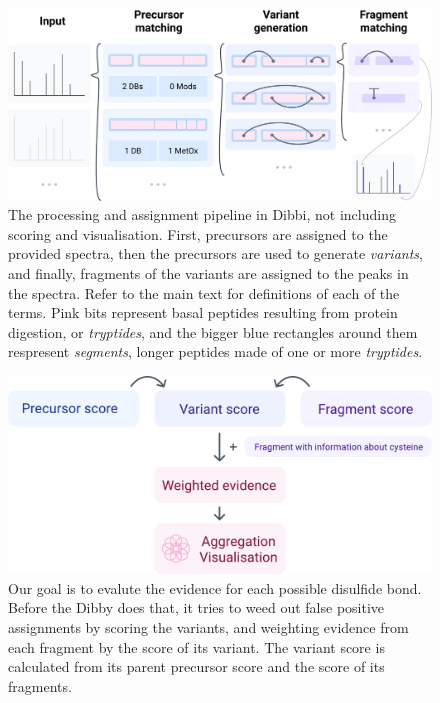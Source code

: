 \begin{figure}
	\centering
	\includegraphics[width=\linewidth]{img/pipeline.pdf}
	\caption{The processing and assignment pipeline in Dibbi, not including scoring and visualisation. First, precursors are assigned to the provided spectra, then the precursors are used to generate \emph{variants}, and finally, fragments of the variants are assigned to the peaks in the spectra. Refer to the main text for definitions of each of the terms. Pink bits represent basal peptides resulting from protein digestion, or \emph{tryptides}, and the bigger blue rectangles around them respresent \emph{segments}, longer peptides made of one or more \emph{tryptides}.}\label{fig:pipeline}

\end{figure}

\begin{figure}
	\centering
	\includegraphics[width=0.9\linewidth]{img/score-calculation.pdf}
	\caption{Our goal is to evalute the evidence for each possible disulfide bond. Before the Dibby does that, it tries to weed out false positive assignments by scoring the variants, and weighting evidence from each fragment by the score of its variant. The variant score is calculated from its parent precursor score and the score of its fragments.}\label{fig:score-calculation}
\end{figure}


